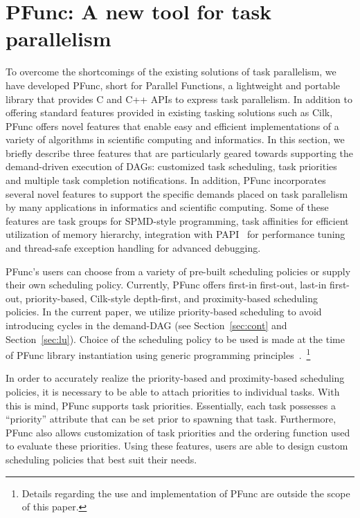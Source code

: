 \documentclass[10pt,conference]{IEEEtran}
\begin{document}
\section{PFunc: A new tool for task parallelism}
\label{sec:pfunc}
To overcome the shortcomings of the existing solutions of task parallelism, we
have developed PFunc, short for Parallel Functions, a lightweight and portable
library that provides C and C++ APIs to express task parallelism. In addition
to offering standard features provided in existing tasking solutions such as
Cilk, PFunc offers novel features that enable easy and efficient
implementations of a variety of algorithms in scientific computing and
informatics. In this section, we briefly describe three features that are
particularly geared towards supporting the demand-driven execution of DAGs:
customized task scheduling, task priorities and multiple task completion
notifications.
In addition, PFunc incorporates several novel features to support the specific
demands placed on task parallelism by many applications in informatics and
scientific computing.  Some of these features are task groups for SPMD-style
programming, task affinities for efficient utilization of memory hierarchy,
integration with PAPI~\cite{papi} for performance tuning and thread-safe \Cpp{}
exception handling for advanced debugging.

PFunc's users can choose from a variety of pre-built scheduling policies or
supply their own scheduling policy. Currently, PFunc offers first-in first-out,
last-in first-out, priority-based, Cilk-style depth-first, and proximity-based
scheduling policies. In the current paper, we utilize priority-based scheduling
to avoid introducing cycles in the demand-DAG (see Section~\ref{sec:cont} and
Section~\ref{sec:lu}).  Choice of the scheduling policy to be used is made at
the time of PFunc library instantiation using generic programming
principles~\cite{MusserStepanov88}.~\footnote{ Details regarding the use and
implementation of PFunc are outside the scope of this paper.}

In order to accurately realize the priority-based and proximity-based
scheduling policies, it is necessary to be able to attach priorities to
individual tasks. With this is mind, PFunc supports task priorities.
Essentially, each task possesses a ``priority'' attribute that can be set prior
to spawning that task. Furthermore, PFunc also allows customization of task 
priorities and the ordering function used to evaluate these priorities. Using
these features, users are able to design custom scheduling policies that best 
suit their needs. 
\end{document}
